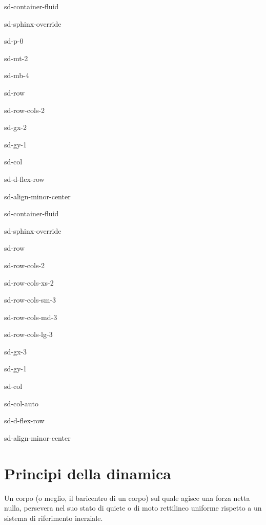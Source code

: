 \documentclass[letterpaper,10pt,english]{jupyterBook}
\begin{document}
\begin{sphinxuseclass}{sd-container-fluid}
\begin{sphinxuseclass}{sd-sphinx-override}
\begin{sphinxuseclass}{sd-p-0}
\begin{sphinxuseclass}{sd-mt-2}
\begin{sphinxuseclass}{sd-mb-4}
\begin{sphinxuseclass}{sd-row}
\begin{sphinxuseclass}{sd-row-cols-2}
\begin{sphinxuseclass}{sd-gx-2}
\begin{sphinxuseclass}{sd-gy-1}
\begin{sphinxuseclass}{sd-col}
\begin{sphinxuseclass}{sd-d-flex-row}
\begin{sphinxuseclass}{sd-align-minor-center}
\begin{sphinxuseclass}{sd-container-fluid}
\begin{sphinxuseclass}{sd-sphinx-override}
\begin{sphinxuseclass}{sd-row}
\begin{sphinxuseclass}{sd-row-cols-2}
\begin{sphinxuseclass}{sd-row-cols-xs-2}
\begin{sphinxuseclass}{sd-row-cols-sm-3}
\begin{sphinxuseclass}{sd-row-cols-md-3}
\begin{sphinxuseclass}{sd-row-cols-lg-3}
\begin{sphinxuseclass}{sd-gx-3}
\begin{sphinxuseclass}{sd-gy-1}
\begin{sphinxuseclass}{sd-col}
\begin{sphinxuseclass}{sd-col-auto}
\begin{sphinxuseclass}{sd-d-flex-row}
\begin{sphinxuseclass}{sd-align-minor-center}
\end{sphinxuseclass}
\end{sphinxuseclass}
\end{sphinxuseclass}
\end{sphinxuseclass}
\end{sphinxuseclass}
\end{sphinxuseclass}
\end{sphinxuseclass}
\end{sphinxuseclass}
\end{sphinxuseclass}
\end{sphinxuseclass}
\end{sphinxuseclass}
\end{sphinxuseclass}
\end{sphinxuseclass}
\end{sphinxuseclass}
\end{sphinxuseclass}
\end{sphinxuseclass}
\end{sphinxuseclass}
\end{sphinxuseclass}
\end{sphinxuseclass}
\end{sphinxuseclass}
\end{sphinxuseclass}
\end{sphinxuseclass}
\end{sphinxuseclass}
\end{sphinxuseclass}
\end{sphinxuseclass}
\end{sphinxuseclass}

\section{Principi della dinamica}
\label{\detokenize{ch/dynamics-principles:principi-della-dinamica}}\label{\detokenize{ch/dynamics-principles:classical-mechanics-dynamics-principles}}\label{\detokenize{ch/dynamics-principles::doc}}
\sphinxAtStartPar
{}
Un corpo (o meglio, il baricentro di un corpo) sul quale agisce una forza netta nulla, persevera nel suo stato di quiete o di moto rettilineo uniforme rispetto a un sistema di riferimento inerziale.
\end{document}
